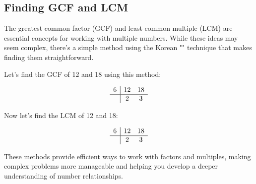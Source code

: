 \subsection{Finding GCF and LCM}

The greatest common factor (GCF) and least common multiple (LCM) are essential concepts for working with multiple numbers. While these ideas may seem complex, there's a simple method using the Korean "" technique that makes finding them straightforward.

\blockquote{}

\blockquote{}

Let's find the GCF of 12 and 18 using this method:

\[
\begin{array}{r|cc}
6 & 12 & 18 \\
\hline
  & 2 & 3
\end{array}
\]

\blockquote{}

\blockquote{}

Now let's find the LCM of 12 and 18:

\[
\begin{array}{r|cc}
6 & 12 & 18 \\
\hline
  & 2 & 3
\end{array}
\]

\blockquote{}


These methods provide efficient ways to work with factors and multiples, making complex problems more manageable and helping you develop a deeper understanding of number relationships.
